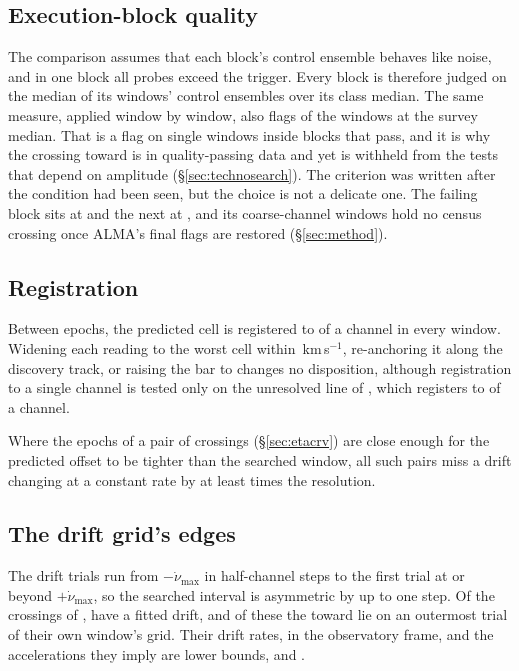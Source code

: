 \begin{table}
\centering
\scriptsize
\setlength{\tabcolsep}{3pt}
\caption{Unattributed crossings observed and expected, with the chance
probability, for each control field and line mask.}
\label{tab:choicegrid}

\end{table}

\subsection{Execution-block quality}
\label{sec:blockquality}

The comparison assumes that each block's control ensemble behaves like
noise, and in one block all \NCtrl{} probes exceed the trigger. Every block
is therefore judged on the median of its windows' control ensembles over its
class median. The same measure, applied window by window, also flags
\DqNWin{} of the \NWindows{} windows at \BqFactor{} the survey median. That is
a flag on single windows inside blocks that pass, and it is why the crossing
toward \BkFlagOtherStar{} is in quality-passing data and yet is withheld from
the tests that depend on amplitude (\S\ref{sec:technosearch}). The criterion was written after the condition
had been seen, but the choice is not a delicate one. The failing block sits
at \BqFailQ{} and the next at \BqNextQ, and its \BqFailNWin{} coarse-channel
windows hold no census crossing once ALMA's final flags are restored
(\S\ref{sec:method}).

\subsection{Registration}
\label{sec:regbudget}

Between epochs, the predicted cell is registered to \RgBudgetChMed{} of a
channel in every window. Widening each reading to the worst cell within
\RgTolKms\,km\,s$^{-1}$, re-anchoring it along the discovery track, or
raising the bar to \ZtTrialThr{} changes no disposition, although
registration to a single channel is tested only on the unresolved line of
\RgRegStar, which registers to \RgRegMaxCh{} of a channel.

\label{sec:pairacct}%
Where the epochs of a pair of crossings (\S\ref{sec:etacrv}) are close
enough for the predicted offset to be tighter than the searched window, all
\TjNPower{} such pairs miss a drift changing at a constant rate by at least
\TjSigMin{} times the resolution.

\subsection{The drift grid's edges}
\label{sec:edge}

The drift trials run from $-\dot\nu_{\max}$ in half-channel steps to the
first trial at or beyond $+\dot\nu_{\max}$, so the searched interval is
asymmetric by up to one step. Of the \EgNPop{} crossings of \EgDriftPop,
\EgNDrift{} have a fitted drift, and of these the \EgNEdge{} toward
\EgEdgeStars{} lie on an outermost trial of their own window's grid. Their
drift rates, in the observatory frame, and the accelerations they imply are
lower bounds, and \EgEdgeOutClause.
